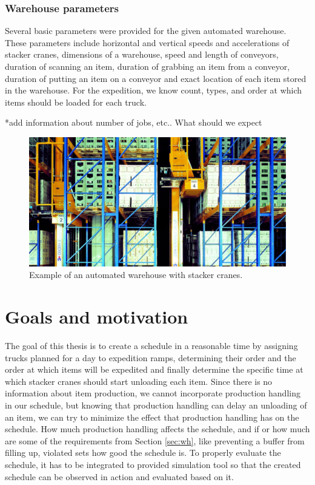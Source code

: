 \documentclass{ctuthesis}
\begin{document}
\subsubsection{Warehouse parameters}

Several basic parameters were provided for the given automated warehouse. These parameters include horizontal and vertical speeds and accelerations of stacker cranes, dimensions of a warehouse, speed and length of conveyors, duration of scanning an item, duration of grabbing an item from a conveyor, duration of putting an item on a conveyor and exact location of each item stored in the warehouse. For the expedition, we know count, types, and order at which items should be loaded for each truck. 

*add information about number of jobs, etc.. What should we expect

\begin{figure}
\includegraphics[width=0.8\linewidth]{highbaywarehouse.jpg}
\caption{Example of an automated warehouse with stacker cranes. \cite{warehousepic}}
\label{fig:foobar}
\end{figure}

\section{Goals and motivation}

The goal of this thesis is to create a schedule in a reasonable time by assigning trucks planned for a day to expedition ramps, determining their order and the order at which items will be expedited and finally determine the specific time at which stacker cranes should start unloading each item. Since there is no information about item production, we cannot incorporate production handling in our schedule, but knowing that production handling can delay an unloading of an item, we can try to minimize the effect that production handling has on the schedule. How much production handling affects the schedule, and if or how much are some of the requirements from Section \ref{sec:wh}, like preventing a buffer from filling up, violated sets how good the schedule is. To properly evaluate the schedule, it has to be integrated to provided simulation tool so that the created schedule can be observed in action and evaluated based on it. 
\end{document}
